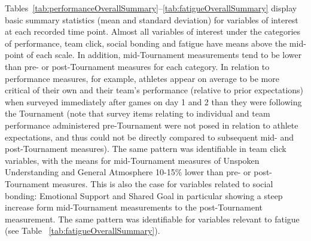 \documentclass[12pt]{report}
\begin{document}
{Tables~\ref{tab:performanceOverallSummary}\nobreakdash--\ref{tab:fatigueOverallSummary} display basic summary statistics (mean and standard deviation) for variables of interest at each recorded time point. Almost all variables of interest under the categories of performance, team click, social bonding and fatigue have means above the mid-point of each scale. In addition, mid-Tournament measurements tend to be lower than pre- or post-Tournament measures for each category. In relation to performance measures, for example, athletes appear on average to be more critical of their own and their team’s performance (relative to prior expectations) when surveyed immediately after games on day 1 and 2 than they were following the Tournament (note that survey items relating to individual and team performance administered pre-Tournament were not posed in relation to athlete expectations, and thus could not be directly compared to subsequent mid- and post-Tournament measures). The same pattern was identifiable in team click variables, with the means for mid-Tournament measures of Unspoken Understanding and General Atmosphere 10-15\% lower than pre- or post-Tournament measures. This is also the case for variables related to social bonding: Emotional Support and Shared Goal in particular showing a steep increase form mid-Tournament measurements to the post-Tournament measurement. The same pattern was identifiable for variables relevant to fatigue (see Table ~\ref{tab:fatigueOverallSummary}).\\






}
\end{document}

